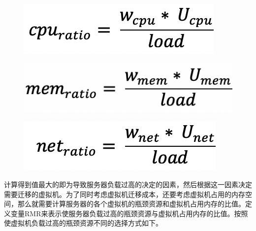  \begin{figure}[ht]
  \centering
  \includegraphics{./Figure/IMG_Chap3_9.png}
  \caption{}\label{Fig:chap3_9}
\end{figure}

 \begin{figure}[ht]
  \centering
  \includegraphics{./Figure/IMG_Chap3_10.png}
  \caption{}\label{Fig:chap3_10}
\end{figure}

 \begin{figure}[ht]
  \centering
  \includegraphics{./Figure/IMG_Chap3_11.png}
  \caption{}\label{Fig:chap3_11}
\end{figure}

计算得到值最大的即为导致服务器负载过高的决定的因素，然后根据这一因素决定需要迁移的虚拟机。为了同时考虑虚拟机迁移成本，还要考虑虚拟机占用的内存空间，那么就需要计算服务器的各个虚拟机的瓶颈资源和虚拟机占用内存的比值。定义变量RMR来表示使服务器负载过高的瓶颈资源与虚拟机占用内存的比值。按照使虚拟机负载过高的瓶颈资源不同的选择方式如下。

